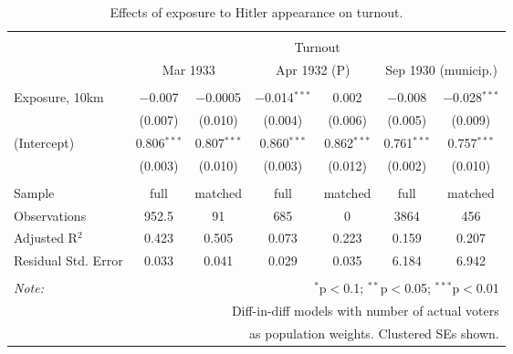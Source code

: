 
\begin{table}[!htbp] \centering 
  \caption{Effects of exposure to Hitler appearance on turnout.} 
  \label{tab:turnout-dd-2} 
\begin{tabular}{@{\extracolsep{5pt}}lcccccc} 
\\[-1.8ex]\hline 
\hline \\[-1.8ex] 
 & \multicolumn{6}{c}{Turnout} \\ 
\cline{2-7} 
 & \multicolumn{2}{c}{Mar 1933} & \multicolumn{2}{c}{Apr 1932 (P)} & \multicolumn{2}{c}{Sep 1930 (municip.)} \\ 
\hline \\[-1.8ex] 
 Exposure, 10km & $-$0.007 & $-$0.0005 & $-$0.014$^{***}$ & 0.002 & $-$0.008 & $-$0.028$^{***}$ \\ 
  & (0.007) & (0.010) & (0.004) & (0.006) & (0.005) & (0.009) \\ 
  (Intercept) & 0.806$^{***}$ & 0.807$^{***}$ & 0.860$^{***}$ & 0.862$^{***}$ & 0.761$^{***}$ & 0.757$^{***}$ \\ 
  & (0.003) & (0.010) & (0.003) & (0.012) & (0.002) & (0.010) \\ 
 \hline \\[-1.8ex] 
Sample & full & matched & full & matched & full & matched \\ 
Observations & 952.5 & 91 & 685 & 0 & 3864 & 456 \\ 
Adjusted R$^{2}$ & 0.423 & 0.505 & 0.073 & 0.223 & 0.159 & 0.207 \\ 
Residual Std. Error & 0.033 & 0.041 & 0.029 & 0.035 & 6.184 & 6.942 \\ 
\hline 
\hline \\[-1.8ex] 
\textit{Note:}  & \multicolumn{6}{r}{$^{*}$p$<$0.1; $^{**}$p$<$0.05; $^{***}$p$<$0.01} \\ 
 & \multicolumn{6}{r}{Diff-in-diff models with number of actual voters} \\ 
 & \multicolumn{6}{r}{as population weights. Clustered SEs shown.} \\ 
\end{tabular} 
\end{table} 
